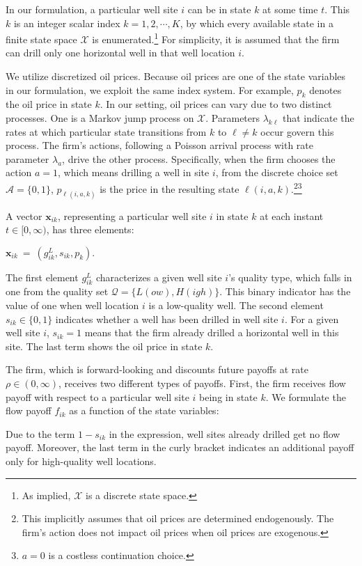In our formulation, a particular well site $i$ can be in state $k$ at some time $t$. This $k$ is an integer scalar index $k = 1, 2, \cdots, K$, by which every available state in a finite state space $\mathcal{X}$ is enumerated.\footnote{As implied, $\mathcal{X}$ is a discrete state space.} For simplicity, it is assumed that the firm can drill only one horizontal well in that well location $i$. 

We utilize discretized oil prices. Because oil prices are one of the state variables in our formulation, we exploit the same index system. For example, $p_{k}$ denotes the oil price in state $k$. In our setting, oil prices can vary due to two distinct processes. One is a Markov jump process on $\mathcal{X}$. Parameters $\lambda_{k\ell}$ that indicate the rates at which particular state transitions from $k$ to $\ell \neq k$ occur govern this process. The firm's actions, following a Poisson arrival process with rate parameter $\lambda_{a}$, drive the other process. Specifically, when the firm chooses the action $a = 1$, which means drilling a well in site $i$, from the discrete choice set $\mathcal{A} = \{ 0, 1 \}$, $p_{\ell(i, a, k)}$ is the price in the resulting state $\ell(i, a, k)$.\footnote{This implicitly assumes that oil prices are determined endogenously. The firm's action does not impact oil prices when oil prices are exogenous.}\footnote{$a = 0$ is a costless continuation choice.}

A vector $\boldsymbol{x}_{ik}$, representing a particular well site $i$ in state $k$ at each instant $t \in [0, \infty)$, has three elements:
\begin{center}
    $\boldsymbol{x}_{ik} \ = \ (g_{ik}^{L}, s_{ik}, p_{k}).$
\end{center}
The first element $g_{ik}^{L}$ characterizes a given well site $i$'s quality type, which falls in one from the quality set $\mathcal{Q} = \{ L(ow), H(igh) \}$. This binary indicator has the value of one when well location $i$ is a low-quality well. The second element $s_{ik} \in \{ 0, 1 \}$ indicates whether a well has been drilled in well site $i$. For a given well site $i$, $s_{ik} = 1$ means that the firm already drilled a horizontal well in this site. The last term shows the oil price in state $k$.

The firm, which is forward-looking and discounts future payoffs at rate $\rho \in (0, \infty)$, receives two different types of payoffs. First, the firm receives flow payoff with respect to a particular well site $i$ being in state $k$. We formulate the flow payoff $f_{ik}$ as a function of the state variables:

Due to the term $1 - s_{ik}$ in the expression, well sites already drilled get no flow payoff. Moreover, the last term in the curly bracket indicates an additional payoff only for high-quality well locations.

